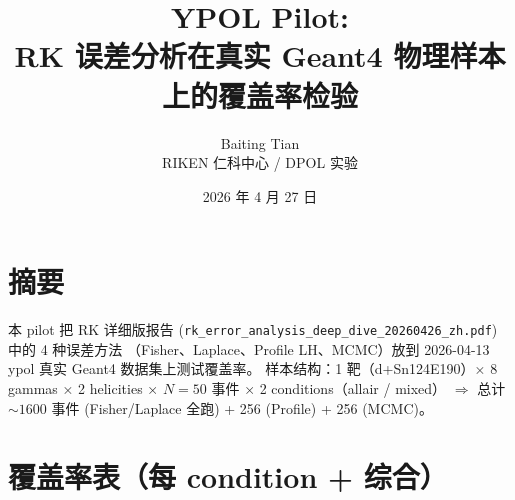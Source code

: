 \documentclass[a4paper,11pt]{article}
\title{\textbf{YPOL Pilot:\\
RK 误差分析在真实 Geant4 物理样本上的覆盖率检验}}
\author{Baiting Tian \\ RIKEN 仁科中心 / DPOL 实验}
\date{2026 年 4 月 27 日}
\begin{document}
\maketitle

\section*{摘要}

本 pilot 把 RK 详细版报告 (\texttt{rk\_error\_analysis\_deep\_dive\_20260426\_zh.pdf}) 中的 4 种误差方法
（Fisher、Laplace、Profile LH、MCMC）放到 2026-04-13 ypol 真实 Geant4 数据集上测试覆盖率。
样本结构：1 靶（d+Sn124E190）× 8 gammas × 2 helicities × $N=50$ 事件 × 2 conditions（allair / mixed）
$\Rightarrow$ 总计 $\sim 1600$ 事件 (Fisher/Laplace 全跑) + 256 (Profile) + 256 (MCMC)。
\section{覆盖率表（每 condition + 综合）}
\end{document}
